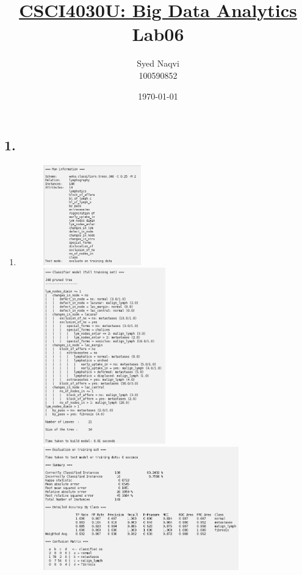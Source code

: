 \documentclass{article}
\title{\textbf{\underline{CSCI4030U: Big Data Analytics}\\Lab06}}
\author{Syed Naqvi\\100590852}
\date{\today}
\begin{document}
    \maketitle

    \subsection*{1.}
    
    \begin{enumerate}[label = (\alph*), left=10pt, itemsep=10pt]
        
        \item \begin{minipage}[t]{0.9\textwidth}
            \begin{figure}[H]
                \includegraphics[width=0.4\textwidth, height=0.2\textheight]{./6ai1.png}\\
                \includegraphics[width=0.5\textwidth, height=0.3\textheight]{./6aii1.png}\\
                \includegraphics[width=0.8\textwidth, height=0.3\textheight]{./6aiii1.png}                

\end{figure}
\end{minipage}
\end{enumerate}
\end{document}
